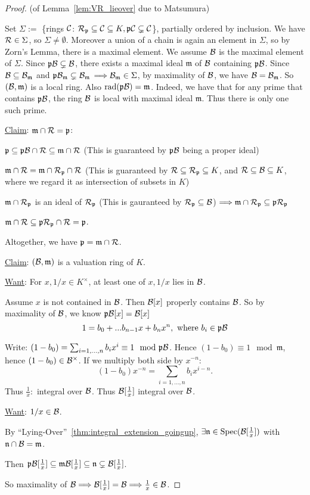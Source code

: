 \documentclass[11pt]{article}
\newcommand{\scm}{{\mathfrak m}}
\newcommand{\scn}{{\mathfrak n}}
\newcommand{\scp}{{\mathfrak p}}
\newcommand{\calb}{{\cal B}}
\newcommand{\calc}{{\cal C}}
\newcommand{\calr}{{\cal R}}
\newcommand{\Lrta}{\Longrightarrow}
\begin{document}
\begin{proof}(of Lemma~\ref{lem:VR_lieover} due to Matsumura)

Set $\Sigma:=$ \{rings $\calc$: $\calr_\scp\subseteq \calc\subseteq K, \scp\calc\subsetneq \calc$\}, partially ordered by inclusion. We have $\calr\in\Sigma$, so $\Sigma \neq \emptyset$. Moreover a union of a chain is again an element in $\Sigma$, so by Zorn's Lemma, there is a maximal element. We assume $\calb$ is the maximal element of $\Sigma$. Since $\scp\calb\subsetneq \calb$, there exists a maximal ideal $\scm$ of $\calb$ containing $\scp\calb$. Since $\calb\subseteq\calb_\scm$ and $\scp\calb_\scm\subsetneq\calb_\scm$ $\Lrta\calb_\scm\in \Sigma$, by maximality of $\calb$, we have $\calb=\calb_\scm$. So $(\calb,\scm)$ is a local ring. Also $\text{rad}(\scp\calb)=\scm$. Indeed, we have that for any prime that contains $\scp\calb$, the ring $\calb$ is local with maximal ideal $\scm$. Thus there is only one such prime.

\underline{Claim}: $\scm\cap\calr=\scp$:

$\scp\subseteq\scp\calb\cap\calr\subseteq\scm\cap\calr$ (This is guaranteed by $\scp\calb$ being a proper ideal)

$\scm\cap\calr=\scm\cap\calr_\scp\cap\calr$ 
(This is guaranteed by $\calr\subseteq\calr_\scp\subseteq K$, and $\calr\subseteq\calb\subseteq K$, where we regard it as intersection of subsets in $K$)

$\scm\cap\calr_\scp$ is an ideal of $\calr_\scp$ 
(This is gauranteed by $\calr_\scp\subseteq\calb$)
$\Lrta \scm\cap\calr_\scp\subseteq\scp\calr_\scp$

$\scm\cap\calr\subseteq\scp\calr_\scp\cap\calr=\scp$. 

Altogether, we have $\scp=\scm\cap\calr$. 

\underline{Claim}: $(\calb,\scm)$ is a valuation ring of $K$.

\underline{Want}: For $x,1/x\in K^\times$, at least one of $x,1/x$ lies in $\calb$.

Assume $x$ is not contained in $\calb$. Then $\calb[x]$ properly contains $\calb$. So by maximality of $\calb$, we know $\scp\calb[x]=\calb[x]$
$$
1=b_0+...b_{n-1}x+b_nx^n, \text{ where $b_i\in\scp\calb$}
$$



Write: $(1-b_0)=\sum_{i=1,...,n}b_i x^i\equiv 1\mod \scp\calb$. Hence $(1-b_0)\equiv 1\mod \scm$, hence  $(1-b_0)\in \calb^\times$. If we multiply both side by $x^{-n}$:
$$
(1-b_0)x^{-n}=\sum_{i=1,...,n}b_i x^{i-n}.
$$
Thus $\frac{1}{x}: $ integral over $\calb$. Thus $\calb[\frac{1}{x}]$ integral over $\calb$.

\underline{Want}: $1/x\in \calb$. 

By ``Lying-Over''~\ref{thm:integral_extension_goingup}, $\exists \scn\in \text{Spec}(\calb[\frac{1}{x}])$ with $\scn\cap \calb=\scm$.

Then $\scp\calb[\frac{1}{x}]\subseteq\scm\calb[\frac{1}{x}]\subseteq \scn\subsetneq \calb[\frac{1}{x}]$.

So maximality of $\calb\Lrta \calb[\frac{1}{x}]=\calb\Lrta \frac{1}{x}\in \calb$.
\end{proof}
\end{document}
